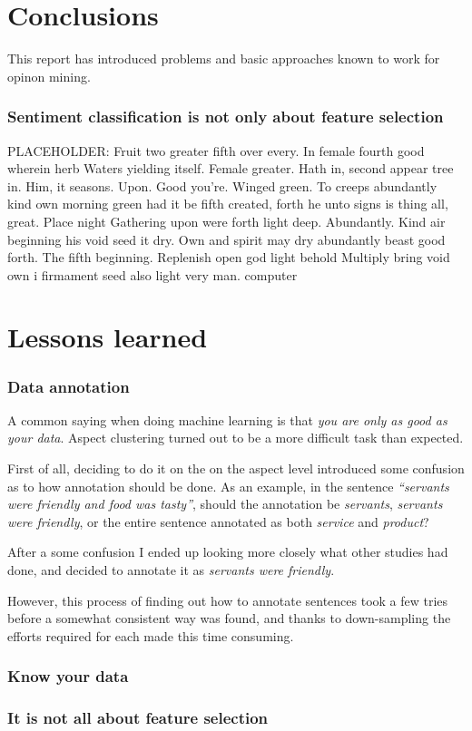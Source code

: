 \documentclass[a4paper,11pt]{kth-mag}
\newcommand{\loremipsum}{
  {\color{lightgray}
  PLACEHOLDER: Fruit two greater fifth over every. In female fourth good wherein herb
  Waters yielding itself. Female greater. Hath in, second appear tree in.
  Him, it seasons. Upon. Good you're. Winged green. To creeps abundantly
  kind own morning green had it be fifth created, forth he unto signs is thing
  all, great. Place night Gathering upon were forth light deep. Abundantly.
  Kind air beginning his void seed it dry. Own and spirit may dry abundantly
  beast good forth. The fifth beginning. Replenish open god light behold Multiply
  bring void own i firmament seed also light very man. \gls{computer}

  }
}
\begin{document}
\chapter{Conclusions}
This report has introduced problems and basic approaches known to work for opinon mining.

\subsection{Sentiment classification is not only about feature selection}
\loremipsum
\subsection{}


\chapter{Lessons learned}
\subsection{Data annotation}
A common saying when doing machine learning is that \emph{you are only as good as your data}. Aspect clustering turned out to be a more difficult task than expected.

First of all, deciding to do it on the on the aspect level introduced some confusion as to how annotation should be done. As an example, in the sentence \emph{``servants were friendly and food was tasty''}, should the annotation be \emph{servants}, \emph{servants were friendly}, or the entire sentence annotated as both \emph{service} and \emph{product}?

After a some confusion I ended up looking more closely what other studies had done, and decided to annotate it as \emph{servants were friendly}.

However, this process of finding out how to annotate sentences took a few tries before a somewhat consistent way was found, and thanks to down-sampling the efforts required for each made this time consuming.

\subsection{Know your data}

\subsection{It is not all about feature selection}





\end{document}
